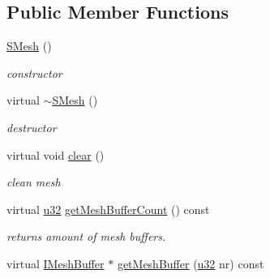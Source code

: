 \subsection*{Public Member Functions}
\begin{DoxyCompactItemize}
\item 
\mbox{\label{structirr_1_1scene_1_1SMesh_aab06c74fc6a28e791e09b9f91f9ded89}} 
\hyperlink{structirr_1_1scene_1_1SMesh_aab06c74fc6a28e791e09b9f91f9ded89}{S\+Mesh} ()
\begin{DoxyCompactList}\small\item\em constructor \end{DoxyCompactList}\item 
\mbox{\label{structirr_1_1scene_1_1SMesh_aafb289351ba15b01c139159f028928e6}} 
virtual \hyperlink{structirr_1_1scene_1_1SMesh_aafb289351ba15b01c139159f028928e6}{$\sim$\+S\+Mesh} ()
\begin{DoxyCompactList}\small\item\em destructor \end{DoxyCompactList}\item 
\mbox{\label{structirr_1_1scene_1_1SMesh_a9a59598f69840164cc06a2059ff4de68}} 
virtual void \hyperlink{structirr_1_1scene_1_1SMesh_a9a59598f69840164cc06a2059ff4de68}{clear} ()
\begin{DoxyCompactList}\small\item\em clean mesh \end{DoxyCompactList}\item 
\mbox{\label{structirr_1_1scene_1_1SMesh_a08f677a62f8e3770af70293c8043fff4}} 
virtual \hyperlink{namespaceirr_a0416a53257075833e7002efd0a18e804}{u32} \hyperlink{structirr_1_1scene_1_1SMesh_a08f677a62f8e3770af70293c8043fff4}{get\+Mesh\+Buffer\+Count} () const
\begin{DoxyCompactList}\small\item\em returns amount of mesh buffers. \end{DoxyCompactList}\item 
\mbox{\label{structirr_1_1scene_1_1SMesh_ad88b3ecd7e6f00e0ea5defb76ed205fc}} 
virtual \hyperlink{classirr_1_1scene_1_1IMeshBuffer}{I\+Mesh\+Buffer} $\ast$ \hyperlink{structirr_1_1scene_1_1SMesh_ad88b3ecd7e6f00e0ea5defb76ed205fc}{get\+Mesh\+Buffer} (\hyperlink{namespaceirr_a0416a53257075833e7002efd0a18e804}{u32} nr) const

\end{DoxyCompactItemize}
